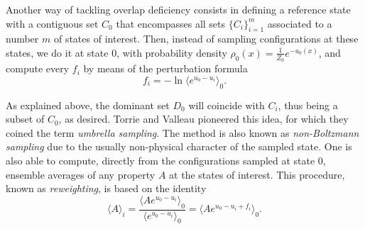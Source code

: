 \documentclass[aip,jcp,reprint,amsmath,amssymb]{revtex4-1}
\begin{document}
Another way of tackling overlap deficiency consists in defining a reference state with a contiguous set $C_0$ that encompasses all sets $\{C_i\}_{i=1}^m$ associated to a number $m$ of states of interest. Then, instead of sampling configurations at these states, we do it at state $0$, with probability density $\rho_0(x) = \frac{1}{Z_0} e^{-u_0(x)}$, and compute every $f_i$ by means of the perturbation formula
\begin{equation}
\label{eq:umbrella sampling free energy}
f_i = -\ln \langle e^{u_0-u_i} \rangle_0.
\end{equation}

As explained above, the dominant set $D_0$ will coincide with $C_i$, thus being a subset of $C_0$, as desired. Torrie and Valleau\cite{Torrie_1977} pioneered this idea, for which they coined the term \textit{umbrella sampling}. The method is also known as \textit{non-Boltzmann sampling} due to the usually non-physical character of the sampled state. One is also able to compute, directly from the configurations sampled at state $0$, ensemble averages of any property $A$ at the states of interest. This procedure, known as \textit{reweighting}, is based on the identity\cite{Torrie_1977}
\begin{equation}
\label{eq:umbrella sampling reweighting}
\langle A \rangle_i = \frac{\langle A e^{u_0 - u_i} \rangle_0}{\langle e^{u_0 - u_i} \rangle_0} = \langle A e^{u_0 - u_i + f_i} \rangle_0.
\end{equation}
\end{document}
